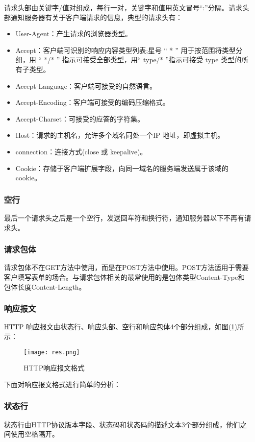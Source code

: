 \documentclass[bachelor]{thesis-uestc}
\begin{document}
请求头部由关键字/值对组成，每行一对，关键字和值用英文冒号“:”分隔。请求头部通知服务器有关于客户端请求的信息，典型的请求头有：
\begin{itemize}
	\item User-Agent：产生请求的浏览器类型。
	\item Accept：客户端可识别的响应内容类型列表;星号 “ * ” 用于按范围将类型分组，用 “ */* ” 指示可接受全部类型，用“ type/* ”指示可接受 type 类型的所有子类型。
	\item Accept-Language：客户端可接受的自然语言。
	\item Accept-Encoding：客户端可接受的编码压缩格式。
	\item Accept-Charset：可接受的应答的字符集。
	\item Host：请求的主机名，允许多个域名同处一个IP 地址，即虚拟主机。
	\item connection：连接方式(close 或 keepalive)。
	\item Cookie：存储于客户端扩展字段，向同一域名的服务端发送属于该域的cookie。
\end{itemize}

\subsubsection*{空行}


最后一个请求头之后是一个空行，发送回车符和换行符，通知服务器以下不再有请求头。

\subsubsection*{请求包体}

请求包体不在GET方法中使用，而是在POST方法中使用。POST方法适用于需要客户填写表单的场合。与请求包体相关的最常使用的是包体类型Content-Type和包体长度Content-Length。

\subsubsection{响应报文}

HTTP 响应报文由状态行、响应头部、空行和响应包体4个部分组成，如图(\ref{httpres})所示：
\begin{figure}[h]
\texttt{[image: res.png]}	
\caption{HTTP响应报文格式}
\label{httpres} 
\end{figure}

下面对响应报文格式进行简单的分析：
\subsubsection*{状态行}
状态行由HTTP协议版本字段、状态码和状态码的描述文本3个部分组成，他们之间使用空格隔开。
\end{document}
